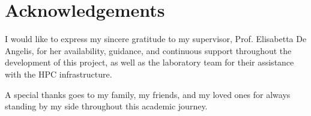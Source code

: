 \chapter*{Acknowledgements}
\label{ch:acknowledgements}

I would like to express my sincere gratitude to my supervisor, Prof. Elisabetta De Angelis, for her availability, guidance, and continuous support throughout the development of this project, as well as the laboratory team for their assistance with the HPC infrastructure. %

A special thanks goes to my family, my friends, and my loved ones for always standing by my side throughout this academic journey. %